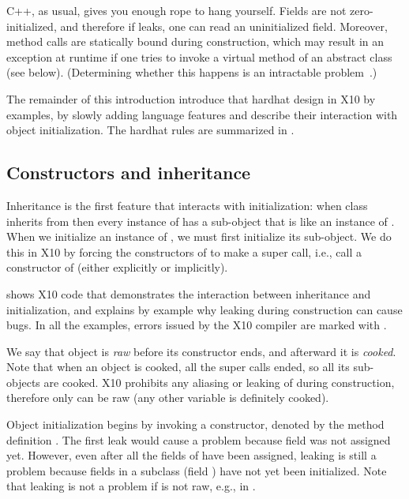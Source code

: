 \mbox{C++}, as usual, gives you enough rope to hang yourself.
Fields are not zero-initialized, and therefore if \this leaks,
    one can read an uninitialized field.
Moreover, method calls are statically bound during construction,
    which may result in an exception at runtime
    if one tries to invoke a virtual method of an abstract class (see  below).
(Determining whether this happens is an intractable problem~\cite{Gil:1998:CTA:646155.679689}.)


The remainder of this introduction introduce that
    hardhat design in X10 by examples,
    by slowly adding language features and describe their interaction with
    object initialization.
The hardhat rules are summarized in .

\subsection{Constructors and inheritance}
Inheritance is the first feature that interacts with initialization:
    when class  inherits from 
    then every instance of  has a sub-object that is like an instance of .
When we initialize an instance of , we must first initialize its  sub-object.
We do this in X10 by forcing the constructors of  to make a super call,
    i.e., call a constructor of 
    (either explicitly or implicitly).

 shows X10 code that demonstrates the interaction
    between inheritance and initialization,
    and explains by example why leaking \this during construction can cause bugs.
In all the examples, errors issued by the X10 compiler are marked with .

We say that object is \emph{raw} before its constructor ends,
    and afterward it is \emph{cooked}.
Note that when an object is cooked, all the super calls ended, so all its sub-objects are cooked.
X10 prohibits any aliasing or leaking of \this during construction,
    therefore only \this can be raw (any other variable is definitely cooked).

Object initialization begins by invoking a constructor,
    denoted by the method definition .
The first leak would cause a problem because field  was not assigned yet.
However, even after all the fields of  have been assigned,
    leaking is still a problem
    because fields in a subclass (field ) have not yet been initialized.
Note that leaking is not a problem if \this is not raw, e.g., in .

